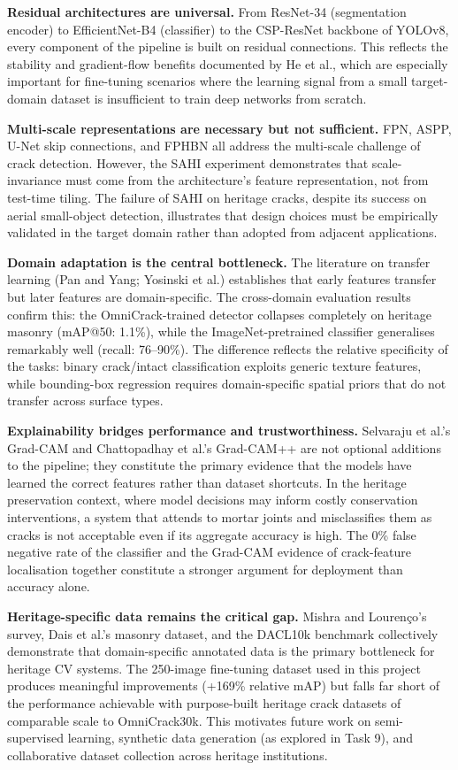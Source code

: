 \documentclass[12pt,a4paper]{article}
\begin{document}
\textbf{Residual architectures are universal.} From ResNet-34 (segmentation encoder) to EfficientNet-B4 (classifier) to the CSP-ResNet backbone of YOLOv8, every component of the pipeline is built on residual connections. This reflects the stability and gradient-flow benefits documented by He et al., which are especially important for fine-tuning scenarios where the learning signal from a small target-domain dataset is insufficient to train deep networks from scratch.

\textbf{Multi-scale representations are necessary but not sufficient.} FPN, ASPP, U-Net skip connections, and FPHBN all address the multi-scale challenge of crack detection. However, the SAHI experiment demonstrates that scale-invariance must come from the architecture's feature representation, not from test-time tiling. The failure of SAHI on heritage cracks, despite its success on aerial small-object detection, illustrates that design choices must be empirically validated in the target domain rather than adopted from adjacent applications.

\textbf{Domain adaptation is the central bottleneck.} The literature on transfer learning (Pan and Yang; Yosinski et al.) establishes that early features transfer but later features are domain-specific. The cross-domain evaluation results confirm this: the OmniCrack-trained detector collapses completely on heritage masonry (mAP@50: 1.1\%), while the ImageNet-pretrained classifier generalises remarkably well (recall: 76--90\%). The difference reflects the relative specificity of the tasks: binary crack/intact classification exploits generic texture features, while bounding-box regression requires domain-specific spatial priors that do not transfer across surface types.

\textbf{Explainability bridges performance and trustworthiness.} Selvaraju et al.'s Grad-CAM and Chattopadhay et al.'s Grad-CAM++ are not optional additions to the pipeline; they constitute the primary evidence that the models have learned the correct features rather than dataset shortcuts. In the heritage preservation context, where model decisions may inform costly conservation interventions, a system that attends to mortar joints and misclassifies them as cracks is not acceptable even if its aggregate accuracy is high. The 0\% false negative rate of the classifier and the Grad-CAM evidence of crack-feature localisation together constitute a stronger argument for deployment than accuracy alone.

\textbf{Heritage-specific data remains the critical gap.} Mishra and Lourenço's survey, Dais et al.'s masonry dataset, and the DACL10k benchmark collectively demonstrate that domain-specific annotated data is the primary bottleneck for heritage CV systems. The 250-image fine-tuning dataset used in this project produces meaningful improvements (+169\% relative mAP) but falls far short of the performance achievable with purpose-built heritage crack datasets of comparable scale to OmniCrack30k. This motivates future work on semi-supervised learning, synthetic data generation (as explored in Task 9), and collaborative dataset collection across heritage institutions.
\end{document}
